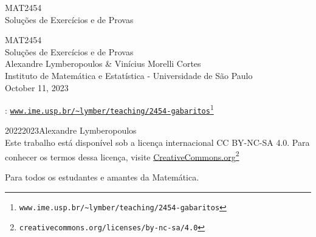 \documentclass[oneside,10pt,]{book}
\newcommand{\titlepagefont}{\relax}
\newcommand{\mono}[1]{\texttt{#1}}
\numberwithin{equation}{section}
\begin{document}
\raggedbottom
\frontmatter
\thispagestyle{empty}
{\titlepagefont\centering
\vspace*{0.28\textheight}
{\Huge MAT\textendash{}2454}\\[2\baselineskip]
{\LARGE Soluções de Exercícios e de Provas}\\
}
\clearpage
\thispagestyle{empty}
{\titlepagefont\centering
\vspace*{0.14\textheight}
{\Huge MAT\textendash{}2454}\\[\baselineskip]
{\LARGE Soluções de Exercícios e de Provas}\\[3\baselineskip]
{\Large Alexandre Lymberopoulos \& Vinícius Morelli Cortes}\\[0.5\baselineskip]
{\Large Instituto de Matemática e Estatística - Universidade de São Paulo}\\[3\baselineskip]
{\Large October 11, 2023}\\}
\clearpage
\thispagestyle{empty}
\hypertarget{colophon-meta_frontmatter-b}{}
: \href{https://www.ime.usp.br/\~lymber/teaching/2454-gabaritos}{\mono{www.ime.usp.br/\textasciitilde{}lymber/teaching/2454-gabaritos}}\footnote{\nolinkurl{www.ime.usp.br/\~lymber/teaching/2454-gabaritos}\label{fn-meta_frontmatter-b-a-b}}\par\medskip
\noindent\textcopyright{}2022\textendash{}2023\quad{}Alexandre Lymberopoulos\\[0.5\baselineskip]
 Este trabalho está disponível sob a licença internacional CC BY-NC-SA 4.0. Para conhecer os termos dessa licença, visite \href{https://creativecommons.org/licenses/by-nc-sa/4.0/deed.pt_BR}{CreativeCommons.org}\footnote{\nolinkurl{creativecommons.org/licenses/by-nc-sa/4.0}\label{fn-meta_frontmatter-b-b-c-b}}\par\medskip
{}
\null\clearpage
\cleardoublepage
\thispagestyle{empty}
\begin{center}\Large%
Para todos os estudantes e amantes da Matemática.%
\end{center}
\end{document}
